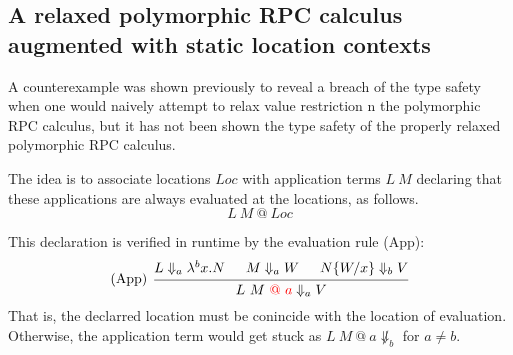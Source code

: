 \documentclass[a4paper]{article}
\makeatletter
\theoremstyle{plain}
\theoremstyle{definition}
\newcommand{\evalRPC}[3]{#1\Downarrow_{#2}#3}
\newcommand{\lamL}[3]{\lambda^{#1}#2.#3}
\newcommand{\subst}[2]{\{#1/#2\}}
\newcommand{\Loc}{Loc}
\newcommand{\at}[1]{@#1}
\makeatother
\begin{document}

\subsection{A relaxed polymorphic RPC calculus augmented with static location contexts}

%
A counterexample was shown previously to reveal a breach of the type
safety when one would naively attempt to relax value restriction n the
polymorphic RPC calculus, but it has not been shown the type safety of
the properly relaxed polymorphic RPC calculus.
%

The idea is to associate locations $\Loc$ with application terms $L
\ M$ declaring that these applications are always evaluated at the
locations, as follows.
\[
L \ M \ @ \ \Loc
\]

%
This declaration is verified in runtime by the evaluation rule (App):
\[
    \begin{prooftree}
      \hypo{ \evalRPC{L}{a}{\lamL{b}{x}{N}} }
      \hypo{ \evalRPC{M}{a}{W} }
      \hypo{ \evalRPC{N\subst{W}{x}}{b}{V}  }
      \infer[left label=(App)]3{ \evalRPC{L \ M \ {\color{red} \at{\ a}}}{a}{V}  }
    \end{prooftree}
\]
%
That is, the declarred location must be conincide with the location of
evaluation.
%
Otherwise, the application term would get stuck as $L \ M
\ \at{\ a}\not\Downarrow_{b}$ for $a\not=b$.
\end{document}
